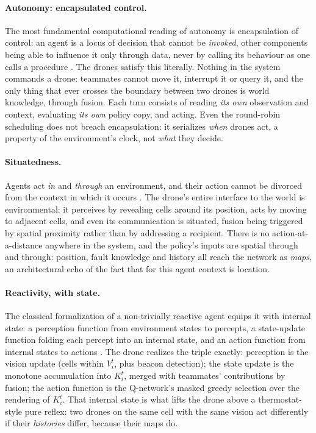 \paragraph{Autonomy: encapsulated control.}
The most fundamental computational reading of autonomy is encapsulation of
control: an agent is a locus of decision that cannot be \emph{invoked}, other
components being able to influence it only through data, never by calling its
behaviour as one calls a procedure \citep{wooldridge1995intelligent}. The drones
satisfy this literally. Nothing in the system commands a drone: teammates cannot
move it, interrupt it or query it, and the only thing that ever crosses the
boundary between two drones is world knowledge, through fusion. Each turn
consists of reading \emph{its own} observation and context, evaluating \emph{its
own} policy copy, and acting. Even the round-robin scheduling does not breach
encapsulation: it serializes \emph{when} drones act, a property of the
environment's clock, not \emph{what} they decide.

\paragraph{Situatedness.}
Agents act \emph{in} and \emph{through} an environment, and their action cannot
be divorced from the context in which it occurs \citep{suchman1987plans}. The
drone's entire interface to the world is environmental: it perceives by revealing
cells around its position, acts by moving to adjacent cells, and even its
communication is situated, fusion being triggered by spatial proximity rather
than by addressing a recipient. There is no action-at-a-distance anywhere in the
system, and the policy's inputs are spatial through and through: position, fault
knowledge and history all reach the network as \emph{maps}, an architectural echo
of the fact that for this agent context is location.

\paragraph{Reactivity, with state.}
The classical formalization of a non-trivially reactive agent equips it with
internal state: a perception function from environment states to percepts, a
state-update function folding each percept into an internal state, and an action
function from internal states to actions \citep{wooldridge2009introduction}. The
drone realizes the triple exactly: perception is the vision update (cells within
$V_i^t$, plus beacon detection); the state update is the monotone accumulation
into $K_i^t$, merged with teammates' contributions by fusion; the action function
is the Q-network's masked greedy selection over the rendering of $K_i^t$. That
internal state is what lifts the drone above a thermostat-style pure reflex: two
drones on the same cell with the same vision act differently if their
\emph{histories} differ, because their maps do.

